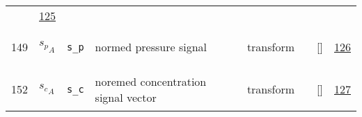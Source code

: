 \begin{longtable}{|p{1cm}|p{3cm}|p{3cm}|p{7cm}|p{3.0cm}|p{3cm}|p{2cm}|p{1cm}|}
             & \hyperlink{"e:125"}{ 125 }
                 \\
    149
             & \hypertarget{"v:149"}{ $ {s_{p}}_{A} $}
             & \verb|s_p|
             & normed pressure signal
             & \begin{lay}transform \end{lay}
             & $  $
             & []
             & \hyperlink{"e:126"}{ 126 }
                 \\
    152
             & \hypertarget{"v:152"}{ $ {s_{c}}_{A} $}
             & \verb|s_c|
             & noremed concentration signal vector
             & \begin{lay}transform \end{lay}
             & $  $
             & []
             & \hyperlink{"e:127"}{ 127 }
                 \\
    \end{longtable}
